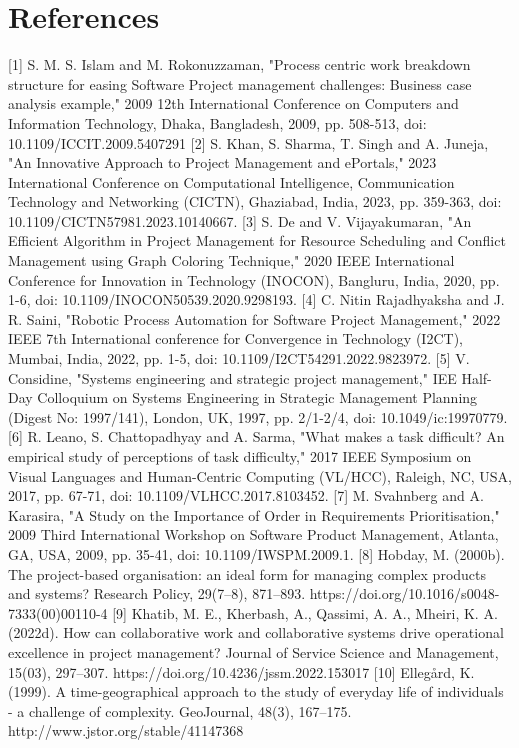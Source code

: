 \documentclass{chart}
\begin{document}
\section{References} 
\bgroup\obeylines
\linespacing[1.66] 
 \hspace{1cm}[1] S. M. S. Islam and M. Rokonuzzaman, "Process centric work breakdown structure for easing Software Project management challenges: Business case analysis example," 2009 12th International Conference on Computers and Information Technology, Dhaka, Bangladesh, 2009, pp. 508-513, doi: 10.1109/ICCIT.2009.5407291
[2] S. Khan, S. Sharma, T. Singh and A. Juneja, "An Innovative Approach to Project Management and ePortals," 2023 International Conference on Computational Intelligence, Communication Technology and Networking (CICTN), Ghaziabad, India, 2023, pp. 359-363, doi: 10.1109/CICTN57981.2023.10140667.
[3] S. De and V. Vijayakumaran, "An Efficient Algorithm in Project Management for Resource Scheduling and Conflict Management using Graph Coloring Technique," 2020 IEEE International Conference for Innovation in Technology (INOCON), Bangluru, India, 2020, pp. 1-6, doi: 10.1109/INOCON50539.2020.9298193.
[4] C. Nitin Rajadhyaksha and J. R. Saini, "Robotic Process Automation for Software Project Management," 2022 IEEE 7th International conference for Convergence in Technology (I2CT), Mumbai, India, 2022, pp. 1-5, doi: 10.1109/I2CT54291.2022.9823972.
[5] V. Considine, "Systems engineering and strategic project management," IEE Half-Day Colloquium on Systems Engineering in Strategic Management Planning (Digest No: 1997/141), London, UK, 1997, pp. 2/1-2/4, doi: 10.1049/ic:19970779.
[6] R. Leano, S. Chattopadhyay and A. Sarma, "What makes a task difficult? An empirical study of perceptions of task difficulty," 2017 IEEE Symposium on Visual Languages and Human-Centric Computing (VL/HCC), Raleigh, NC, USA, 2017, pp. 67-71, doi: 10.1109/VLHCC.2017.8103452.
[7] M. Svahnberg and A. Karasira, "A Study on the Importance of Order in Requirements Prioritisation," 2009 Third International Workshop on Software Product Management, Atlanta, GA, USA, 2009, pp. 35-41, doi: 10.1109/IWSPM.2009.1.
[8] Hobday, M. (2000b). The project-based organisation: an ideal form for managing complex products and systems? Research Policy, 29(7–8), 871–893. https://doi.org/10.1016/s0048-7333(00)00110-4
[9] Khatib, M. E., Kherbash, A., Qassimi, A. A., Mheiri, K. A. (2022d). How can collaborative work and collaborative systems drive operational excellence in project management? Journal of Service Science and Management, 15(03), 297–307. https://doi.org/10.4236/jssm.2022.153017
[10] Ellegård, K. (1999). A time-geographical approach to the study of everyday life of individuals - a challenge of complexity. GeoJournal, 48(3), 167–175. http://www.jstor.org/stable/41147368


 



 
\end{document}
